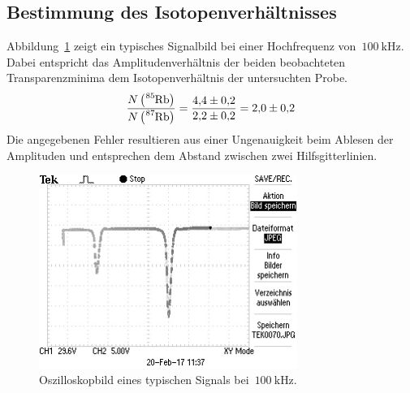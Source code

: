 \subsection{Bestimmung des Isotopenverhältnisses}
Abbildung~\ref{fig:signalbild} zeigt ein typisches Signalbild bei einer
Hochfrequenz von~$\SI{100}{\kilo\hertz}$. Dabei entspricht das
Amplitudenverhältnis der beiden beobachteten Transparenzminima dem
Isotopenverhältnis der untersuchten Probe.
%
\begin{equation}
  \frac{N\left(\ce{^85Rb}\right)}{N\left(\ce{^87Rb}\right)}
  =\frac{\num{4.4(2)}}{\num{2.2(2)}}
  =\num{2.0(2)}
\end{equation}
%
Die angegebenen Fehler resultieren aus einer Ungenauigkeit beim Ablesen der
Amplituden und entsprechen dem Abstand zwischen zwei Hilfsgitterlinien.
%
\begin{figure}[htb]
  \centering
  \includegraphics[width=0.75\textwidth]{analysis/signalbild.png}
  \caption{Oszilloskopbild eines typischen Signals
  bei~$\SI{100}{\kilo\hertz}$.}
  \label{fig:signalbild}
\end{figure}
%

